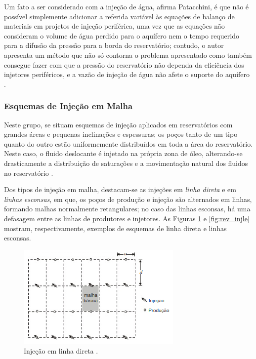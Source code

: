 Um fato a ser considerado com a inje\c{c}\~{a}o de \'{a}gua, afirma Patacchini, \'{e} que n\~{a}o \'{e} poss\'{i}vel simplemente adicionar a referida vari\'{a}vel \`{a}s equa\c{c}\~{o}es de balan\c{c}o de materiais em projetos de inje\c{c}\~{a}o perif\'{e}rica, uma vez que as equa\c{c}\~{o}es n\~{a}o consideram o volume de \'{a}gua perdido para o aqu\'{i}fero nem o tempo requerido para a difus\~{a}o da press\~{a}o para a borda do reservat\'{o}rio; contudo, o autor apresenta um m\'{e}todo que n\~{a}o s\'{o} contorna o problema apresentado como tamb\'{e}m consegue fazer com que a press\~{a}o do reservat\'{o}rio n\~{a}o dependa da efici\^{e}ncia dos injetores perif\'{e}ricos, e a vaz\~{a}o de inje\c{c}\~{a}o de \'{a}gua n\~{a}o afete o suporte do aqu\'{i}fero \cite{PATACCHINI2017720}.

\subsubsection{Esquemas de Inje\c{c}\~{a}o em Malha}
Neste grupo, se situam esquemas de inje\c{c}\~{a}o aplicados em reservat\'{o}rios com grandes \'{a}reas e pequenas inclina\c{c}\~{o}es e espessuras; os po\c{c}os tanto de um tipo quanto do outro est\~{a}o uniformemente distribu\'{i}dos em toda a \'{a}rea do reservat\'{o}rio. Neste caso, o fluido deslocante \'{e} injetado na pr\'{o}pria zona de \'{o}leo, alterando-se drasticamente a distribui\c{c}\~{a}o de satura\c{c}\~{o}es e a movimenta\c{c}\~{a}o natural dos fluidos no reservat\'{o}rio \cite[p. 567]{engres}.

Dos tipos de inje\c{c}\~{a}o em malha, destacam-se as inje\c{c}\~{o}es em \textit{linha direta} e em \textit{linhas esconsas}, em que, os po\c{c}os de produ\c{c}\~{a}o e inje\c{c}\~{a}o s\~{a}o alternados em linhas, formando malhas normalmente retangulares; no caso das linhas esconsas, h\'{a} uma defasagem entre as linhas de produtores e injetores. As Figuras \ref{fig:rev_injld} e \ref{fig:rev_injle} mostram, respectivamente, exemplos de esquemas de linha direta e linhas esconsas.

\begin{figure}[!ht]
\centering
\includegraphics[width=.6\textwidth]{figs/revisao/revisao_injld.png}
\caption{Inje\c{c}\~{a}o em linha direta \cite[p. 567]{engres}.}
\label{fig:rev_injld}
\end{figure}

